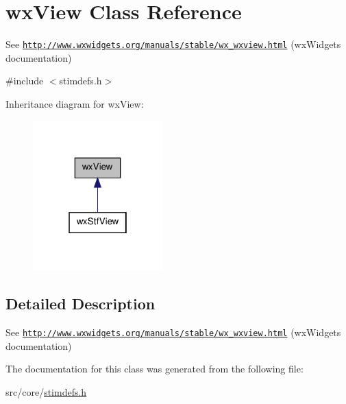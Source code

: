 \hypertarget{classwxView}{
\section{wxView Class Reference}
\label{classwxView}
}


See \href{http://www.wxwidgets.org/manuals/stable/wx_wxview.html}{\tt http://www.wxwidgets.org/manuals/stable/wx\_\-wxview.html} (wxWidgets documentation)  




{\ttfamily \#include $<$stimdefs.h$>$}



Inheritance diagram for wxView:
\nopagebreak
\begin{figure}[H]
\begin{center}
\leavevmode
\includegraphics[width=142pt]{classwxView__inherit__graph}
\end{center}
\end{figure}


\subsection{Detailed Description}
See \href{http://www.wxwidgets.org/manuals/stable/wx_wxview.html}{\tt http://www.wxwidgets.org/manuals/stable/wx\_\-wxview.html} (wxWidgets documentation) 

The documentation for this class was generated from the following file:\begin{DoxyCompactItemize}
\item 
src/core/\hyperlink{stimdefs_8h}{stimdefs.h}\end{DoxyCompactItemize}
